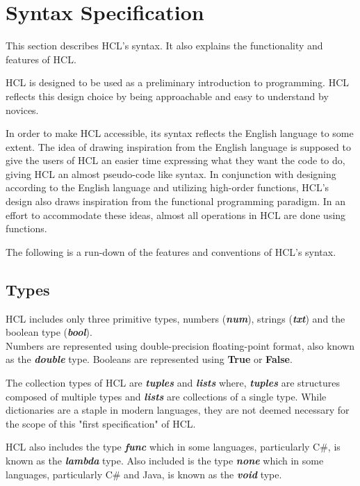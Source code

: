 \section{Syntax Specification}
This section describes HCL's syntax.
It also explains the functionality and features of HCL.

HCL is designed to be used as a preliminary introduction to programming.
HCL reflects this design choice by being approachable and easy to understand by novices.

In order to make HCL accessible, its syntax reflects the English language to some extent.
The idea of drawing inspiration from the English language is supposed to give the users of HCL an easier time expressing what they want the code to do, giving HCL an almost pseudo-code like syntax.
In conjunction with designing according to the English language and utilizing high-order functions, HCL's design also draws inspiration from the functional programming paradigm.
In an effort to accommodate these ideas, almost all operations in HCL are done using functions. 

The following is a run-down of the features and conventions of HCL's syntax.

\subsection{Types}
HCL includes only three primitive types, numbers (\textbf{\textit{num}}), strings (\textbf{\textit{txt}}) and the boolean type (\textbf{\textit{bool}}).\\
Numbers are represented using double-precision floating-point format, also known as the \textbf{\textit{double}} type.
Booleans are represented using \textbf{True} or \textbf{False}.

The collection types of HCL are \textbf{\textit{tuples}} and \textbf{\textit{lists}} where, 
\textbf{\textit{tuples}} are structures composed of multiple types and \textbf{\textit{lists}} are collections of a single type.
While dictionaries are a staple in modern languages, they are not deemed necessary for the scope of this "first specification" of HCL.

HCL also includes the type \textbf{\textit{func}} which in some languages, particularly C\#, is known as the \textbf{\textit{lambda}} type.
Also included is the type \textbf{\textit{none}} which in some languages, particularly C\# and Java, is known as the \textbf{\textit{void}} type. 

